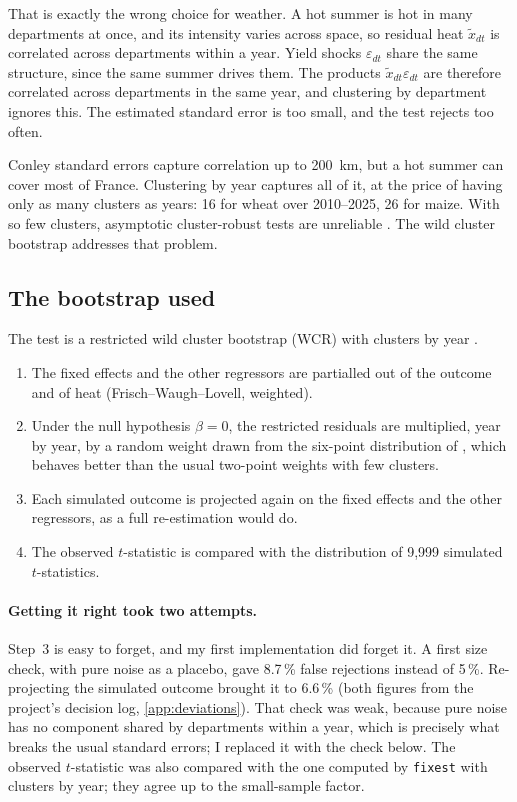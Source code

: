 That is exactly the wrong choice for weather. A hot summer is hot in many departments at once, and its intensity varies across space, so residual heat $\tilde x_{dt}$ is correlated across departments within a year. Yield shocks $\varepsilon_{dt}$ share the same structure, since the same summer drives them. The products $\tilde x_{dt}\varepsilon_{dt}$ are therefore correlated across departments in the same year, and clustering by department ignores this. The estimated standard error is too small, and the test rejects too often.

Conley standard errors capture correlation up to 200~km, but a hot summer can cover most of France. Clustering by year captures all of it, at the price of having only as many clusters as years: 16 for wheat over 2010--2025, 26 for maize. With so few clusters, asymptotic cluster-robust tests are unreliable \parencite{cameron2008}. The wild cluster bootstrap addresses that problem.

\subsection{The bootstrap used}

The test is a restricted wild cluster bootstrap (WCR) with clusters by year \parencite{cameron2008}.
\begin{enumerate}
  \item The fixed effects and the other regressors are partialled out of the outcome and of heat (Frisch--Waugh--Lovell, weighted).
  \item Under the null hypothesis $\beta = 0$, the restricted residuals are multiplied, year by year, by a random weight drawn from the six-point distribution of \textcite{webb2023}, which behaves better than the usual two-point weights with few clusters.
  \item Each simulated outcome is projected again on the fixed effects and the other regressors, as a full re-estimation would do.
  \item The observed $t$-statistic is compared with the distribution of 9,999 simulated $t$-statistics.
\end{enumerate}

\paragraph{Getting it right took two attempts.} Step~3 is easy to forget, and my first implementation did forget it. A first size check, with pure noise as a placebo, gave 8.7\,\% false rejections instead of 5\,\%. Re-projecting the simulated outcome brought it to 6.6\,\% (both figures from the project's decision log, \cref{app:deviations}). That check was weak, because pure noise has no component shared by departments within a year, which is precisely what breaks the usual standard errors; I replaced it with the check below. The observed $t$-statistic was also compared with the one computed by \texttt{fixest} with clusters by year; they agree up to the small-sample factor.

